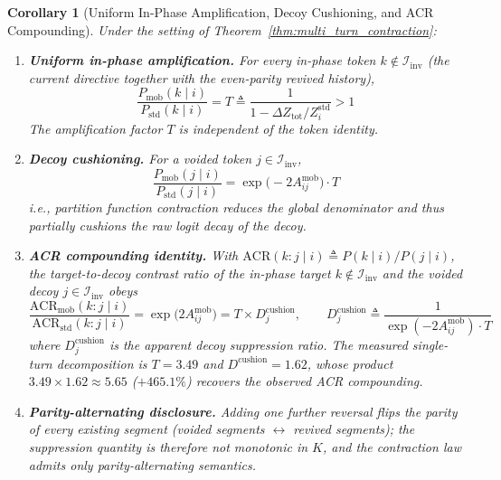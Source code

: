 \documentclass[11pt,a4paper]{article}
\newtheorem{corollary}[theorem]{Corollary}
\theoremstyle{definition}
\begin{document}
\begin{corollary}[Uniform In-Phase Amplification, Decoy Cushioning, and ACR Compounding]
\label{cor:k_turn_acr}
Under the setting of Theorem~\ref{thm:multi_turn_contraction}:
\begin{enumerate}
    \item \textbf{Uniform in-phase amplification.} For every in-phase token $k \notin \mathcal{I}_{\text{inv}}$ (the current directive together with the even-parity revived history),
    \begin{equation}
    \frac{P_{\mathrm{mob}}(k \mid i)}{P_{\mathrm{std}}(k \mid i)} = T \triangleq \frac{1}{1 - \Delta Z_{\text{tot}}/Z_i^{\mathrm{std}}} > 1
    \end{equation}
    The amplification factor $T$ is independent of the token identity.
    \item \textbf{Decoy cushioning.} For a voided token $j \in \mathcal{I}_{\text{inv}}$,
    \begin{equation}
    \frac{P_{\mathrm{mob}}(j \mid i)}{P_{\mathrm{std}}(j \mid i)} = \exp\big(-2A_{ij}^{\text{mob}}\big) \cdot T
    \end{equation}
    i.e., partition function contraction reduces the global denominator and thus partially cushions the raw logit decay of the decoy.
    \item \textbf{ACR compounding identity.} With $\mathrm{ACR}(k : j \mid i) \triangleq P(k \mid i)/P(j \mid i)$, the target-to-decoy contrast ratio of the in-phase target $k \notin \mathcal{I}_{\text{inv}}$ and the voided decoy $j \in \mathcal{I}_{\text{inv}}$ obeys
    \begin{equation}
    \frac{\mathrm{ACR}_{\mathrm{mob}}(k : j \mid i)}{\mathrm{ACR}_{\mathrm{std}}(k : j \mid i)} = \exp\big(2A_{ij}^{\text{mob}}\big) = T \times D_j^{\text{cushion}}, \qquad D_j^{\text{cushion}} \triangleq \frac{1}{\exp(-2A_{ij}^{\text{mob}}) \cdot T}
    \end{equation}
    where $D_j^{\text{cushion}}$ is the apparent decoy suppression ratio. The measured single-turn decomposition is $T = 3.49$ and $D^{\text{cushion}} = 1.62$, whose product $3.49 \times 1.62 \approx 5.65$ ($+465.1\%$) recovers the observed ACR compounding.
    \item \textbf{Parity-alternating disclosure.} Adding one further reversal flips the parity of every existing segment (voided segments $\leftrightarrow$ revived segments); the suppression quantity is therefore \emph{not} monotonic in $K$, and the contraction law admits only parity-alternating semantics.
\end{enumerate}
\end{corollary}
\end{document}
